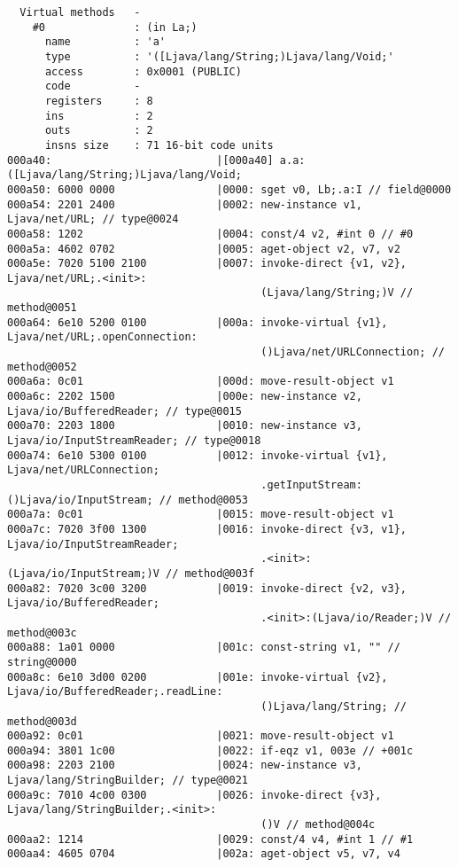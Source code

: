 \begin{lstlisting}
  Virtual methods   -
    #0              : (in La;)
      name          : 'a'
      type          : '([Ljava/lang/String;)Ljava/lang/Void;'
      access        : 0x0001 (PUBLIC)
      code          -
      registers     : 8
      ins           : 2
      outs          : 2
      insns size    : 71 16-bit code units
000a40:                          |[000a40] a.a:([Ljava/lang/String;)Ljava/lang/Void;
000a50: 6000 0000                |0000: sget v0, Lb;.a:I // field@0000
000a54: 2201 2400                |0002: new-instance v1, Ljava/net/URL; // type@0024
000a58: 1202                     |0004: const/4 v2, #int 0 // #0
000a5a: 4602 0702                |0005: aget-object v2, v7, v2
000a5e: 7020 5100 2100           |0007: invoke-direct {v1, v2}, Ljava/net/URL;.<init>:
                                        (Ljava/lang/String;)V // method@0051
000a64: 6e10 5200 0100           |000a: invoke-virtual {v1}, Ljava/net/URL;.openConnection:
                                        ()Ljava/net/URLConnection; // method@0052
000a6a: 0c01                     |000d: move-result-object v1
000a6c: 2202 1500                |000e: new-instance v2, Ljava/io/BufferedReader; // type@0015
000a70: 2203 1800                |0010: new-instance v3, Ljava/io/InputStreamReader; // type@0018
000a74: 6e10 5300 0100           |0012: invoke-virtual {v1}, Ljava/net/URLConnection;
                                        .getInputStream:()Ljava/io/InputStream; // method@0053
000a7a: 0c01                     |0015: move-result-object v1
000a7c: 7020 3f00 1300           |0016: invoke-direct {v3, v1}, Ljava/io/InputStreamReader;
                                        .<init>:(Ljava/io/InputStream;)V // method@003f
000a82: 7020 3c00 3200           |0019: invoke-direct {v2, v3}, Ljava/io/BufferedReader;
                                        .<init>:(Ljava/io/Reader;)V // method@003c
000a88: 1a01 0000                |001c: const-string v1, "" // string@0000
000a8c: 6e10 3d00 0200           |001e: invoke-virtual {v2}, Ljava/io/BufferedReader;.readLine:
                                        ()Ljava/lang/String; // method@003d
000a92: 0c01                     |0021: move-result-object v1
000a94: 3801 1c00                |0022: if-eqz v1, 003e // +001c
000a98: 2203 2100                |0024: new-instance v3, Ljava/lang/StringBuilder; // type@0021
000a9c: 7010 4c00 0300           |0026: invoke-direct {v3}, Ljava/lang/StringBuilder;.<init>:
                                        ()V // method@004c
000aa2: 1214                     |0029: const/4 v4, #int 1 // #1
000aa4: 4605 0704                |002a: aget-object v5, v7, v4

\end{lstlisting}
